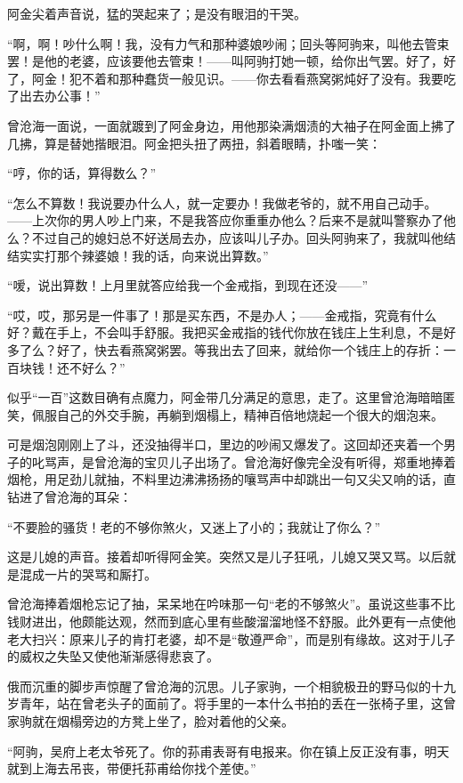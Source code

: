 \par 阿金尖着声音说，猛的哭起来了；是没有眼泪的干哭。
\par “啊，啊！吵什么啊！我，没有力气和那种婆娘吵闹；回头等阿驹来，叫他去管束罢！是他的老婆，应该要他去管束！——叫阿驹打她一顿，给你出气罢。好了，好了，阿金！犯不着和那种蠢货一般见识。——你去看看燕窝粥炖好了没有。我要吃了出去办公事！”
\par 曾沧海一面说，一面就踱到了阿金身边，用他那染满烟渍的大袖子在阿金面上拂了几拂，算是替她揩眼泪。阿金把头扭了两扭，斜着眼睛，扑嗤一笑：
\par “哼，你的话，算得数么？”
\par “怎么不算数！我说要办什么人，就一定要办！我做老爷的，就不用自己动手。——上次你的男人吵上门来，不是我答应你重重办他么？后来不是就叫警察办了他么？不过自己的媳妇总不好送局去办，应该叫儿子办。回头阿驹来了，我就叫他结结实实打那个辣婆娘！我的话，向来说出算数。”
\par “嗳，说出算数！上月里就答应给我一个金戒指，到现在还没——”
\par “哎，哎，那另是一件事了！那是买东西，不是办人；——金戒指，究竟有什么好？戴在手上，不会叫手舒服。我把买金戒指的钱代你放在钱庄上生利息，不是好多了么？好了，快去看燕窝粥罢。等我出去了回来，就给你一个钱庄上的存折：一百块钱！还不好么？”
\par 似乎“一百”这数目确有点魔力，阿金带几分满足的意思，走了。这里曾沧海暗暗匿笑，佩服自己的外交手腕，再躺到烟榻上，精神百倍地烧起一个很大的烟泡来。
\par 可是烟泡刚刚上了斗，还没抽得半口，里边的吵闹又爆发了。这回却还夹着一个男子的叱骂声，是曾沧海的宝贝儿子出场了。曾沧海好像完全没有听得，郑重地捧着烟枪，用足劲儿就抽，不料里边沸沸扬扬的嚷骂声中却跳出一句又尖又响的话，直钻进了曾沧海的耳朵：
\par “不要脸的骚货！老的不够你煞火，又迷上了小的；我就让了你么？”
\par 这是儿媳的声音。接着却听得阿金笑。突然又是儿子狂吼，儿媳又哭又骂。以后就是混成一片的哭骂和厮打。
\par 曾沧海捧着烟枪忘记了抽，呆呆地在吟味那一句“老的不够煞火”。虽说这些事不比钱财进出，他颇能达观，然而到底心里有些酸溜溜地怪不舒服。此外更有一点使他老大扫兴：原来儿子的肯打老婆，却不是“敬遵严命”，而是别有缘故。这对于儿子的威权之失坠又使他渐渐感得悲哀了。
\par 俄而沉重的脚步声惊醒了曾沧海的沉思。儿子家驹，一个相貌极丑的野马似的十九岁青年，站在曾老头子的面前了。将手里的一本什么书拍的丢在一张椅子里，这曾家驹就在烟榻旁边的方凳上坐了，脸对着他的父亲。
\par “阿驹，吴府上老太爷死了。你的荪甫表哥有电报来。你在镇上反正没有事，明天就到上海去吊丧，带便托荪甫给你找个差使。”
